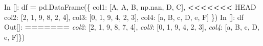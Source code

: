 \documentclass[
]{book}
\newenvironment{Shaded}{\begin{snugshade}}{\end{snugshade}}
\newcommand{\CommentTok}[1]{\textcolor[rgb]{0.56,0.35,0.01}{\textit{#1}}}
\newcommand{\DecValTok}[1]{\textcolor[rgb]{0.00,0.00,0.81}{#1}}
\newcommand{\NormalTok}[1]{#1}
\newcommand{\OperatorTok}[1]{\textcolor[rgb]{0.81,0.36,0.00}{\textbf{#1}}}
\newcommand{\StringTok}[1]{\textcolor[rgb]{0.31,0.60,0.02}{#1}}
\begin{document}
\begin{Shaded}
\begin{Highlighting}[]
\NormalTok{In []: df }\OperatorTok{=}\NormalTok{ pd.DataFrame(\{}
    \StringTok{\textquotesingle{}col1\textquotesingle{}}\NormalTok{: [}\StringTok{\textquotesingle{}A\textquotesingle{}}\NormalTok{, }\StringTok{\textquotesingle{}A\textquotesingle{}}\NormalTok{, }\StringTok{\textquotesingle{}B\textquotesingle{}}\NormalTok{, np.nan, }\StringTok{\textquotesingle{}D\textquotesingle{}}\NormalTok{, }\StringTok{\textquotesingle{}C\textquotesingle{}}\NormalTok{],}
\OperatorTok{\textless{}\textless{}\textless{}\textless{}\textless{}\textless{}\textless{}}\NormalTok{ HEAD}
    \StringTok{\textquotesingle{}col2\textquotesingle{}}\NormalTok{: [}\DecValTok{2}\NormalTok{, }\DecValTok{1}\NormalTok{, }\DecValTok{9}\NormalTok{, }\DecValTok{8}\NormalTok{, }\DecValTok{2}\NormalTok{, }\DecValTok{4}\NormalTok{],}
    \StringTok{\textquotesingle{}col3\textquotesingle{}}\NormalTok{: [}\DecValTok{0}\NormalTok{, }\DecValTok{1}\NormalTok{, }\DecValTok{9}\NormalTok{, }\DecValTok{4}\NormalTok{, }\DecValTok{2}\NormalTok{, }\DecValTok{3}\NormalTok{],}
    \StringTok{\textquotesingle{}col4\textquotesingle{}}\NormalTok{: [}\StringTok{\textquotesingle{}a\textquotesingle{}}\NormalTok{, }\StringTok{\textquotesingle{}B\textquotesingle{}}\NormalTok{, }\StringTok{\textquotesingle{}c\textquotesingle{}}\NormalTok{, }\StringTok{\textquotesingle{}D\textquotesingle{}}\NormalTok{, }\StringTok{\textquotesingle{}e\textquotesingle{}}\NormalTok{, }\StringTok{\textquotesingle{}F\textquotesingle{}}\NormalTok{]}
\NormalTok{\})}
\NormalTok{In []: df}
\NormalTok{Out[]:}
\OperatorTok{=======}
    \CommentTok{\textquotesingle{}col2\textquotesingle{}}\NormalTok{: [}\DecValTok{2}\NormalTok{, }\DecValTok{1}\NormalTok{, }\DecValTok{9}\NormalTok{, }\DecValTok{8}\NormalTok{, }\DecValTok{7}\NormalTok{, }\DecValTok{4}\NormalTok{],}
    \CommentTok{\textquotesingle{}col3\textquotesingle{}}\NormalTok{: [}\DecValTok{0}\NormalTok{, }\DecValTok{1}\NormalTok{, }\DecValTok{9}\NormalTok{, }\DecValTok{4}\NormalTok{, }\DecValTok{2}\NormalTok{, }\DecValTok{3}\NormalTok{],}
    \CommentTok{\textquotesingle{}col4\textquotesingle{}}\NormalTok{: [}\StringTok{\textquotesingle{}a\textquotesingle{}}\NormalTok{, }\StringTok{\textquotesingle{}B\textquotesingle{}}\NormalTok{, }\StringTok{\textquotesingle{}c\textquotesingle{}}\NormalTok{, }\StringTok{\textquotesingle{}D\textquotesingle{}}\NormalTok{, }\StringTok{\textquotesingle{}e\textquotesingle{}}\NormalTok{, }\StringTok{\textquotesingle{}F\textquotesingle{}}\NormalTok{]\})}

\end{Highlighting}
\end{Shaded}
\end{document}
